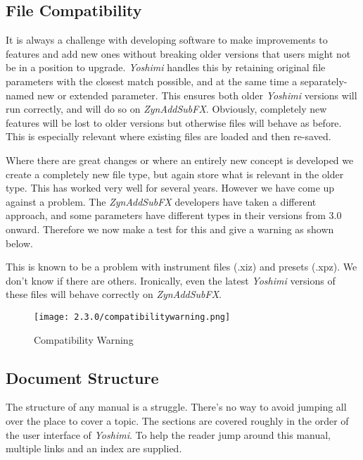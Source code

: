 \documentclass[
 11pt,
 twoside,
 a4paper,
 final                                 %
]{article}
\begin{document}
\subsection{File Compatibility}
\label{subsec:file_compatibility}

   It is always a challenge with developing software to make improvements to
   features and add new ones without breaking older versions that users might
   not be in a position to upgrade. \textsl{Yoshimi} handles this by
   retaining original file parameters with the closest match possible, and at
   the same time a separately-named new or extended parameter. This ensures
   both older \textsl{Yoshimi} versions will run correctly,
   and will do so on \textsl{ZynAddSubFX}.
   Obviously, completely new features will be lost to
   older versions but otherwise files will behave as before. This is
   especially relevant where existing files are loaded and then re-saved.

   Where there are great changes or where an entirely new concept is
   developed we create a completely new file type, but again store what is
   relevant in the older type.
   This has worked very well for several years. However we have come up
   against a problem. The \textsl{ZynAddSubFX} developers have taken a
   different approach, and some parameters have different types in their
   versions from 3.0 onward. Therefore we now make a test for this and give
   a warning as shown below.


   This is known to be a problem with instrument files (.xiz) and presets
   (.xpz). We don't know if there are others. Ironically, even the latest
   \textsl{Yoshimi} versions of these files will behave correctly on
   \textsl{ZynAddSubFX}.

\begin{figure}[H]
   \centering
   \texttt{[image: 2.3.0/compatibilitywarning.png]}
   \caption{Compatibility Warning}
   \label{fig:compatibiilty_warning}
\end{figure}


\subsection{Document Structure}
\label{subsec:introduction_document_structure}

   The structure of any manual is a struggle.
   There's no way to avoid jumping all over the place to
   cover a topic.  The sections are covered roughly
   in the order of the user interface of
   \textsl{Yoshimi}.  To help the reader jump around this manual, multiple
   links and an index are supplied.
\end{document}
